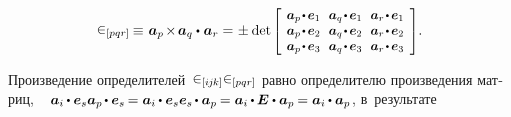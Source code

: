 \begin{otherlanguage}{russian}
\nopagebreak\vspace{-0.4em}\begin{equation*}
\permutationsparitysymbols{pqr} \hspace{-0.15ex}
\equiv \hspace{.16ex} \bm{a}_p \hspace{-0.25ex} \times \hspace{-0.25ex} \bm{a}_q \dotp \hspace{.1ex} \bm{a}_r =
\hspace{.1ex} \pm \hspace{.1ex} \operatorname{det}\hspace{-0.1ex}
\scalebox{0.92}[0.92]{$\left[\hspace{-0.2ex}\begin{array}{c@{\hspace{.64em}}c@{\hspace{.64em}}c}
\bm{a}_p \narrowdotp\hspace{.12ex} \bm{e}_1 & \bm{a}_q \narrowdotp\hspace{.12ex} \bm{e}_1 & \bm{a}_r \narrowdotp\hspace{.12ex} \bm{e}_1 \\
\bm{a}_p \narrowdotp\hspace{.12ex} \bm{e}_2 & \bm{a}_q \narrowdotp\hspace{.12ex} \bm{e}_2 & \bm{a}_r \narrowdotp\hspace{.12ex} \bm{e}_2 \\
\bm{a}_p \narrowdotp\hspace{.12ex} \bm{e}_3 & \bm{a}_q \narrowdotp\hspace{.12ex} \bm{e}_3 & \bm{a}_r \narrowdotp\hspace{.12ex} \bm{e}_3
\end{array}\hspace{-0.12ex}\right]$} .
\end{equation*}

\vspace{.1em}\noindent
Произведение определителей~${\permutationsparitysymbols{i\hspace{-0.1ex}j\hspace{-0.1ex}k} \permutationsparitysymbols{pqr}}$ равно определителю произведения матриц, ~\ru{\:---}  
${\bm{a}_i \hspace{-0.1ex} \dotp \bm{e}_s \bm{a}_p \hspace{-0.2ex} \dotp \bm{e}_s \hspace{-0.2ex}
= \bm{a}_i \hspace{-0.1ex} \dotp \bm{e}_s \bm{e}_s \hspace{-0.2ex} \dotp \bm{a}_p \hspace{-0.15ex}
= \bm{a}_i \hspace{-0.1ex} \dotp \hspace{-0.1ex} \UnitDyad \dotp \bm{a}_p \hspace{-0.15ex}
= \bm{a}_i \hspace{-0.1ex} \dotp \bm{a}_p}$, в~результате


\end{otherlanguage}
